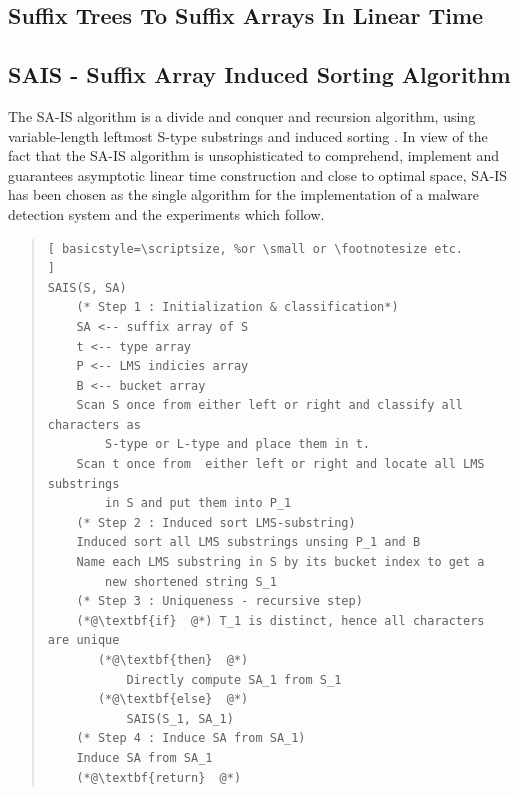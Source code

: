 \documentclass[12pt]{article} %
\begin{document}
\subsection{Suffix Trees To Suffix Arrays In Linear Time}







\subsection{SAIS - Suffix Array Induced Sorting Algorithm}

The SA-IS algorithm  is a divide and conquer and recursion algorithm, using variable-length leftmost S-type substrings and induced sorting \cite{twoeffecient}. In view of the fact that the SA-IS algorithm is unsophisticated to comprehend, implement and guarantees asymptotic linear time construction and close to optimal space,  SA-IS has been chosen as the single algorithm for the implementation of a malware detection system and the experiments which follow. 

\begin{quote}
\begin{lstlisting}[ basicstyle=\scriptsize, %or \small or \footnotesize etc.
]
SAIS(S, SA)
    (* Step 1 : Initialization & classification*)
    SA <-- suffix array of S
    t <-- type array
    P <-- LMS indicies array
    B <-- bucket array
    Scan S once from either left or right and classify all characters as 
        S-type or L-type and place them in t.
    Scan t once from  either left or right and locate all LMS substrings 
        in S and put them into P_1
    (* Step 2 : Induced sort LMS-substring)
    Induced sort all LMS substrings unsing P_1 and B
    Name each LMS substring in S by its bucket index to get a 
        new shortened string S_1
    (* Step 3 : Uniqueness - recursive step)
    (*@\textbf{if}  @*) T_1 is distinct, hence all characters are unique
       (*@\textbf{then}  @*) 
           Directly compute SA_1 from S_1
       (*@\textbf{else}  @*) 
           SAIS(S_1, SA_1)
    (* Step 4 : Induce SA from SA_1)
    Induce SA from SA_1       
    (*@\textbf{return}  @*) 
\end{lstlisting}
\end{quote}
\end{document}
